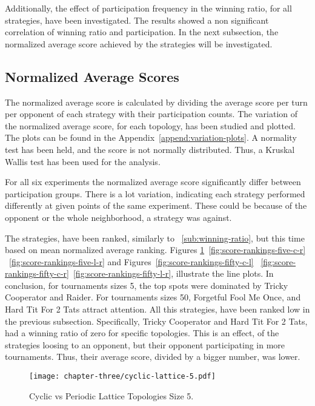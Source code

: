 Additionally, the effect of participation frequency in the winning ratio, for
all strategies, have been investigated. The results showed a non significant
correlation of winning ratio and participation. In the next subsection, the
normalized average score achieved by the strategies will be investigated.

\subsection{Normalized Average Scores}
\label{sub:normalized_av_score}
The normalized average score is calculated by dividing the average score per
turn per opponent of each strategy with their participation counts. The variation
of the normalized average score, for each topology, has been studied and plotted.
The plots can be found in the Appendix~\ref{append:variation-plots}. A normality
test has been held, and the score is not normally distributed. Thus, a Kruskal
Wallis test has been used for the analysis.

For all six experiments the normalized average score significantly differ between
participation groups. There is a lot variation, indicating each strategy performed
differently at given points of the same experiment. These could be because of the
opponent or the whole neighborhood, a strategy was against.

The strategies, have been ranked, similarly to ~\ref{sub:winning-ratio}, but
this time based on mean normalized average ranking. Figures \ref{fig:score-rankings-five-c-l}~\ref{fig:score-rankings-five-c-r}
~\ref{fig:score-rankings-five-l-r} and Figures~\ref{fig:score-rankings-fifty-c-l}
~\ref{fig:score-rankings-fifty-c-r}~\ref{fig:score-rankings-fifty-l-r}, illustrate
the line plots. In conclusion, for tournaments sizes 5, the top spots were dominated
by Tricky Cooperator and Raider. For tournaments sizes 50, Forgetful Fool Me Once,
and Hard Tit For 2 Tats attract attention. All this strategies, have been ranked
low in the previous subsection. Specifically, Tricky Cooperator and Hard Tit For 2 Tats,
had a winning ratio of zero for specific topologies. This is an effect, of the
strategies loosing to an opponent, but their opponent participating in more
tournaments. Thus, their average score, divided by a bigger number, was lower.

\begin{figure}[H]
	\centering
	\texttt{[image: chapter-three/cyclic-lattice-5.pdf]}
	\caption{Cyclic vs Periodic Lattice Topologies Size 5.}
	\label{fig:score-rankings-five-c-l}
\end{figure}

